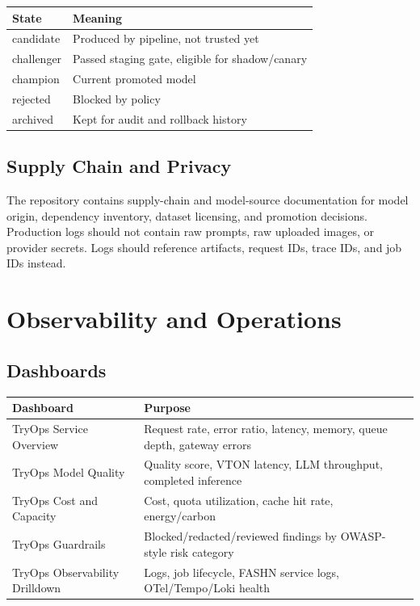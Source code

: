 \documentclass[12pt,a4paper,oneside]{report}
\begin{document}
\begin{center}
\begin{tabular}{ll}
\toprule
\textbf{State} & \textbf{Meaning} \\
\midrule
candidate & Produced by pipeline, not trusted yet \\
challenger & Passed staging gate, eligible for shadow/canary \\
champion & Current promoted model \\
rejected & Blocked by policy \\
archived & Kept for audit and rollback history \\
\bottomrule
\end{tabular}
\end{center}

\section{Supply Chain and Privacy}

The repository contains supply-chain and model-source documentation for model origin, dependency inventory, dataset licensing, and promotion decisions. Production logs should not contain raw prompts, raw uploaded images, or provider secrets. Logs should reference artifacts, request IDs, trace IDs, and job IDs instead.

\chapter{Observability and Operations}

\section{Dashboards}

\begin{longtable}{p{5cm}p{9.8cm}}
\toprule
\textbf{Dashboard} & \textbf{Purpose} \\
\midrule
TryOps Service Overview & Request rate, error ratio, latency, memory, queue depth, gateway errors \\
TryOps Model Quality & Quality score, VTON latency, LLM throughput, completed inference \\
TryOps Cost and Capacity & Cost, quota utilization, cache hit rate, energy/carbon \\
TryOps Guardrails & Blocked/redacted/reviewed findings by OWASP-style risk category \\
TryOps Observability Drilldown & Logs, job lifecycle, FASHN service logs, OTel/Tempo/Loki health \\
\bottomrule
\end{longtable}
\end{document}
